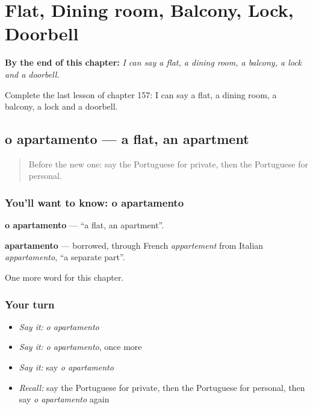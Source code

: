 
\chapter{Flat, Dining room, Balcony, Lock, Doorbell}
\label{ch:pt-flat-dining-room-balcony-lock-doorbell}

\begin{chapteropening}
\textbf{By the end of this chapter:} \emph{I can say a flat, a dining room, a balcony, a lock and a doorbell.}

Complete the last lesson of chapter 157: I can say a flat, a dining room, a balcony, a lock and a doorbell.
\end{chapteropening}

\section[o apartamento]{o apartamento — a flat, an apartment}

\label{lesson:PT-C157-apartamento}



\begin{quote}
Before the new one: say the Portuguese for private, then the Portuguese for personal.
\end{quote}

\subsection*{You'll want to know: o apartamento}
\textbf{o apartamento} — \textquotedblleft{}a flat, an apartment\textquotedblright{}.

\begin{cousinweb}
\textbf{apartamento} — borrowed, through French \emph{appartement} from Italian \emph{appartamento}, \textquotedblleft{}a separate part\textquotedblright{}.
\end{cousinweb}

\begin{grammarlens}[title={What you've built}]
One more word for this chapter.
\end{grammarlens}

\subsection*{Your turn}
\begin{itemize}
\raggedright
  \item \emph{Say it:} \emph{o apartamento}
  \item \emph{Say it:} \emph{o apartamento}, once more
  \item \emph{Say it:} say \emph{o apartamento}
  \item \emph{Recall:} say the Portuguese for private, then the Portuguese for personal, then say \emph{o apartamento} again
\end{itemize}

